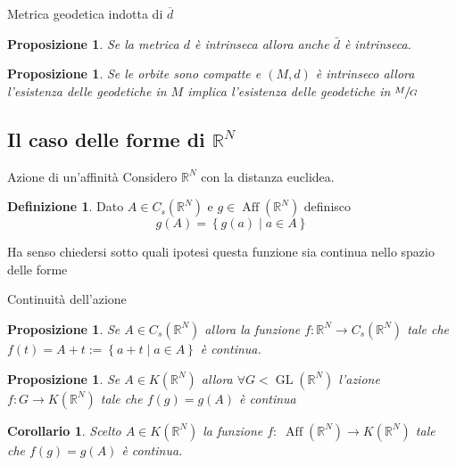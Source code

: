 \documentclass{beamer}
\newcounter{counter1}
\theoremstyle{plain}
\newtheorem{mylem}[counter1]{Lemma}
\newtheorem{mypro}[counter1]{Proposizione}
\newtheorem{mycor}[counter1]{Corollario}
\theoremstyle{definition}
\newtheorem{mydef}[counter1]{Definizione}
\theoremstyle{remark}
\newcommand{\obar}[1]{\overline{#1}}
\newcommand{\set}[1]{\left\{#1\right\}}
\newcommand{\pa}[1]{\left(#1\right)}
\newcommand{\bra}[1]{\left[#1\right]}
\DeclareMathOperator{\len}{len}
\DeclareMathOperator{\gl}{GL}
\DeclareMathOperator{\aff}{Aff}
\begin{document}

\begin{frame}{Metrica geodetica indotta di $\obar d$}
  \begin{mypro}
    Se la metrica $d$ è intrinseca allora anche $\bar d$ è intrinseca.
  \end{mypro}
  \begin{mypro}
    Se le orbite sono compatte e $(M,d)$ è intrinseco allora
    l'esistenza delle geodetiche in $M$ implica l'esistenza delle
    geodetiche in $\sfrac{M}{G}$
  \end{mypro}
\end{frame}

\subsection{Il caso delle forme di $\mathbb{R}^N$}

\begin{frame}{Azione di un'affinità}
  Considero $\mathbb{R}^N$ con la distanza euclidea.
  \begin{mydef}
    Dato $A \in C_s(\mathbb{R}^N)$ e $g \in \aff (\mathbb{R}^N)$
    definisco
    \[ g(A) = \set{ g(a) \mid a \in A } \]
  \end{mydef}
  Ha senso chiedersi sotto quali ipotesi questa funzione sia continua
  nello spazio delle forme
\end{frame}

\begin{frame}{Continuità dell'azione}
  \begin{mypro}
    Se $A \in C_s(\mathbb{R}^N)$ allora la funzione $f: \mathbb{R}^N \to
    C_s(\mathbb{R}^N)$ tale che $f(t) = A + t := \set { a + t \mid a \in
      A}$ è continua.
  \end{mypro}
  \begin{mypro}
    Se $A \in K(\mathbb{R}^N)$ allora $\forall G < \gl (\mathbb{R}^N)$
    l'azione $f: G \rightarrow K(\mathbb{R}^N)$ tale che $f(g) = g(A)$
    è continua
  \end{mypro}
  \begin{mycor}
    Scelto $A \in K(\mathbb{R}^N)$ la funzione $f:\; \aff( \mathbb{R}^N)
    \to K(\mathbb{R}^N)$ tale che $f(g) = g(A)$ è continua.
  \end{mycor}
\end{frame}
\end{document}
